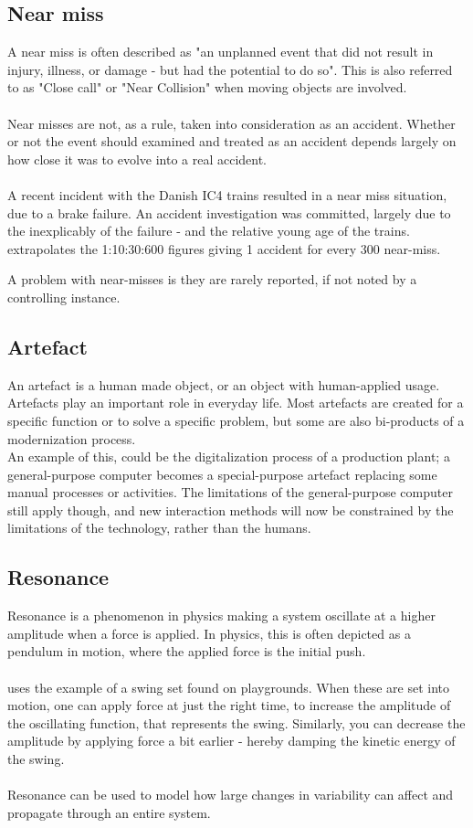 \documentclass[10pt,oneside]{book}                  %
\begin{document}
\subsection{Near miss}
\label{sec:near_miss}
A near miss is often described as "an unplanned event that did not result in injury, illness, or damage - but had the potential to do so". This is also referred to as "Close call" or "Near Collision" when moving objects are involved.\\
\\
Near misses are not, as a rule, taken into consideration as an accident. Whether or not the event should examined and treated as an accident depends largely on how close it was to evolve into a real accident.\\
\\
A recent incident with the Danish IC4 trains resulted in a near miss situation, due to a brake failure. An accident investigation was committed, largely due to the inexplicably of the failure - and the relative young age of the trains.
\cite{hollnagel2004barriers} extrapolates the 1:10:30:600 figures giving 1 accident for every 300 near-miss.

A problem with near-misses is they are rarely reported, if not noted by a controlling instance.

\subsection{Artefact}
An artefact is a human made object, or an object with human-applied usage. Artefacts play an important role in everyday life. Most artefacts are created for a specific function or to solve a specific problem, but some are also bi-products of a modernization process.\\
An example of this, could be the digitalization process of a production plant; a general-purpose computer becomes a special-purpose artefact replacing some manual processes or activities. The limitations of the general-purpose computer still apply though, and new interaction methods will now be constrained by the limitations of the technology, rather than the humans.

\subsection{Resonance}
Resonance is a phenomenon in physics making a system oscillate at a higher amplitude when a force is applied. In physics, this is often depicted as a pendulum in motion, where the applied force is the initial push.\\
\\
\cite{hollnagel2004barriers} uses the example of a swing set found on playgrounds. When these are set into motion, one can apply force at just the right time, to increase the amplitude of the oscillating function, that represents the swing. Similarly, you can decrease the amplitude by applying force a bit earlier - hereby damping the kinetic energy of the swing.\\
\\
Resonance can be used to model how large changes in variability can affect and propagate through an entire system. 
\end{document}
